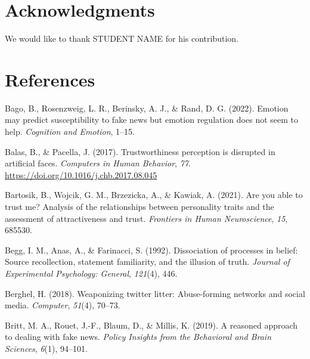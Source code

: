 \documentclass[
  man,floatsintext]{apa6}
\newlength{\cslhangindent}
\newlength{\cslentryspacingunit} %
\newenvironment{CSLReferences}[2] %
 {%
  \setlength{\parindent}{0pt}
  \ifodd #1
  \let\oldpar\par
  \def\par{\hangindent=\cslhangindent\oldpar}
  \fi
  \setlength{\parskip}{#2\cslentryspacingunit}
 }%
 {}
\begin{document}
\hypertarget{acknowledgments}{%
\section{Acknowledgments}\label{acknowledgments}}

We would like to thank STUDENT NAME for his contribution.

\newpage

\hypertarget{references}{%
\section{References}\label{references}}

\hypertarget{refs}{}
\begin{CSLReferences}{1}{0}
\leavevmode{}%
Bago, B., Rosenzweig, L. R., Berinsky, A. J., \& Rand, D. G. (2022). Emotion may predict susceptibility to fake news but emotion regulation does not seem to help. \emph{Cognition and Emotion}, 1--15.

\leavevmode{}%
Balas, B., \& Pacella, J. (2017). Trustworthiness perception is disrupted in artificial faces. \emph{Computers in Human Behavior}, \emph{77}. \url{https://doi.org/10.1016/j.chb.2017.08.045}

\leavevmode{}%
Bartosik, B., Wojcik, G. M., Brzezicka, A., \& Kawiak, A. (2021). Are you able to trust me? Analysis of the relationships between personality traits and the assessment of attractiveness and trust. \emph{Frontiers in Human Neuroscience}, \emph{15}, 685530.

\leavevmode{}%
Begg, I. M., Anas, A., \& Farinacci, S. (1992). Dissociation of processes in belief: Source recollection, statement familiarity, and the illusion of truth. \emph{Journal of Experimental Psychology: General}, \emph{121}(4), 446.

\leavevmode{}%
Berghel, H. (2018). Weaponizing twitter litter: Abuse-forming networks and social media. \emph{Computer}, \emph{51}(4), 70--73.

\leavevmode{}%
Britt, M. A., Rouet, J.-F., Blaum, D., \& Millis, K. (2019). A reasoned approach to dealing with fake news. \emph{Policy Insights from the Behavioral and Brain Sciences}, \emph{6}(1), 94--101.


\end{CSLReferences}
\end{document}
